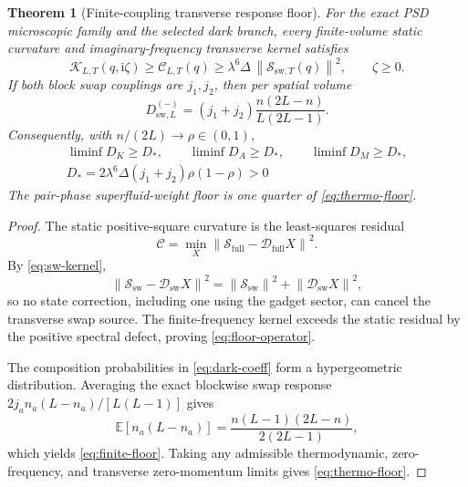 \documentclass[11pt]{article}
\newtheorem{theorem}{Theorem}[section]
\theoremstyle{definition}
\theoremstyle{remark}
\newcommand{\cK}{\mathcal K}
\newcommand{\cC}{\mathcal C}
\newcommand{\cS}{\mathcal S}
\newcommand{\cD}{\mathcal D}
\newcommand{\I}{\mathrm i}
\newcommand{\norm}[1]{\left\lVert #1\right\rVert}
\begin{document}
\begin{theorem}[Finite-coupling transverse response floor]
\label{thm:floor}
For the exact PSD microscopic family and the selected dark branch, every finite-volume static curvature and imaginary-frequency transverse kernel satisfies
\begin{equation}
 \cK_{L,T}(q,\I\zeta)
 \ge\cC_{L,T}(q)
 \ge\lambda^6\Delta\,\norm{\cS_{\mathrm{sw},T}(q)}^2,
 \qquad \zeta\ge0.
 \label{eq:floor-operator}
\end{equation}
If both block swap couplings are $j_1,j_2$, then per spatial volume
\begin{equation}
 \boxed{
 D_{\mathrm{sw},L}^{(-)}
 =(j_1+j_2)\frac{n(2L-n)}{L(2L-1)}.}
 \label{eq:finite-floor}
\end{equation}
Consequently, with $n/(2L)\to\rho\in(0,1)$,
\begin{equation}
 \boxed{
 \begin{gathered}
  \liminf D_K\ge D_*,\qquad
  \liminf D_A\ge D_*,\qquad
  \liminf D_M\ge D_*,\\
  D_*=2\lambda^6\Delta(j_1+j_2)\rho(1-\rho)>0
 \end{gathered}}
 \label{eq:thermo-floor}
\end{equation}
The pair-phase superfluid-weight floor is one quarter of \eqref{eq:thermo-floor}.
\end{theorem}

\begin{proof}
The static positive-square curvature is the least-squares residual
\begin{equation}
 \cC=\min_X\norm{\cS_{\mathrm{full}}-\cD_{\mathrm{full}}X}^2.
\end{equation}
By \eqref{eq:sw-kernel},
\begin{equation}
 \norm{\cS_{\mathrm{sw}}-\cD_{\mathrm{sw}}X}^2
 =\norm{\cS_{\mathrm{sw}}}^2+\norm{\cD_{\mathrm{sw}}X}^2,
\end{equation}
so no state correction, including one using the gadget sector, can cancel the transverse swap source.  The finite-frequency kernel exceeds the static residual by the positive spectral defect, proving \eqref{eq:floor-operator}.

The composition probabilities in \eqref{eq:dark-coeff} form a hypergeometric distribution.  Averaging the exact blockwise swap response
$2j_an_a(L-n_a)/[L(L-1)]$ gives
\begin{equation}
 \mathbb E[n_a(L-n_a)]
 =\frac{n(L-1)(2L-n)}{2(2L-1)},
\end{equation}
which yields \eqref{eq:finite-floor}.  Taking any admissible thermodynamic, zero-frequency, and transverse zero-momentum limits gives \eqref{eq:thermo-floor}.
\end{proof}
\end{document}
